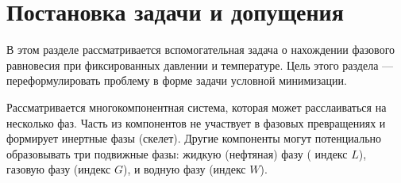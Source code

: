 \documentclass[12pt]{article}
\newcommand{\pd}[2]{\frac{\partial #1}{\partial #2}}
\newtheorem{note}{Примечание}[section]
\begin{document}
%
%
%
%
%
%
%
%
%

\section{Постановка задачи и допущения}

В этом разделе рассматривается вспомогательная задача о нахождении фазового равновесия при фиксированных давлении и температуре. Цель этого раздела --- переформулировать проблему в форме задачи условной минимизации.

Рассматривается многокомпонентная система, которая может расслаиваться на несколько фаз. Часть из компонентов не участвует в фазовых превращениях и формирует инертные фазы (скелет). Другие компоненты могут потенциально образовывать три подвижные фазы: жидкую (нефтяная) фазу ( индекс $L$), газовую фазу (индекс $G$), и водную фазу (индекс $W$).
\end{document}

